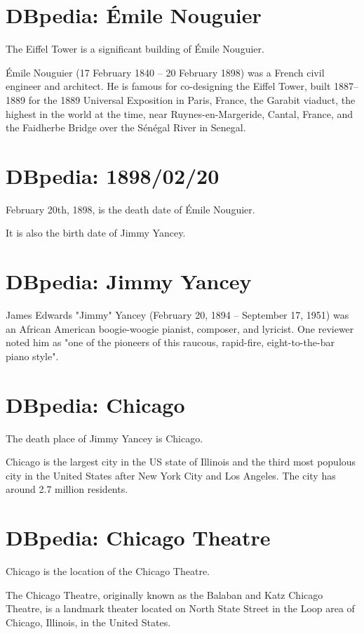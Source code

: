 \documentclass{article}
\begin{document}
\section{DBpedia: Émile Nouguier}
The Eiffel Tower is a significant building of Émile Nouguier.

Émile Nouguier (17 February 1840 – 20 February 1898) was a French civil engineer and architect. He is famous for co-designing the Eiffel Tower, built 1887–1889 for the 1889 Universal Exposition in Paris, France, the Garabit viaduct, the highest in the world at the time, near Ruynes-en-Margeride, Cantal, France, and the Faidherbe Bridge over the Sénégal River in Senegal.

\section{DBpedia: 1898/02/20}
February 20th, 1898, is the death date of Émile Nouguier.

It is also the birth date of Jimmy Yancey.

\clearpage

\section{DBpedia: Jimmy Yancey}
James Edwards "Jimmy" Yancey (February 20, 1894 – September 17, 1951) was an African American boogie-woogie pianist, composer, and lyricist. One reviewer noted him as "one of the pioneers of this raucous, rapid-fire, eight-to-the-bar piano style".

\section{DBpedia: Chicago}
The death place of Jimmy Yancey is Chicago.

Chicago is the largest city in the US state of Illinois and the third most populous city in the United States after New York City and Los Angeles. The city has around 2.7 million residents.

\section{DBpedia: Chicago Theatre}
Chicago is the location of the Chicago Theatre.

The Chicago Theatre, originally known as the Balaban and Katz Chicago Theatre, is a landmark theater located on North State Street in the Loop area of Chicago, Illinois, in the United States.
\end{document}
